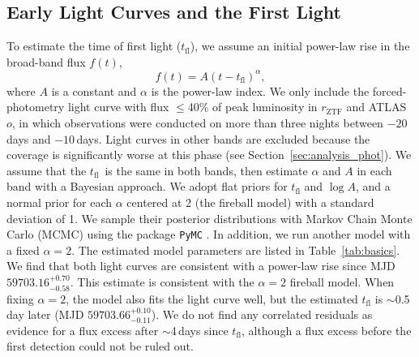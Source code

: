 \documentclass[twocolumn]{aastex631}
\newcommand{\tfl}{$t_\mathrm{fl}$}
\begin{document}
\begin{CJK*}{UTF8}{gbsn}
\subsection{Early Light Curves and the First Light}
To estimate the time of first light ($t_\mathrm{fl}$), we assume an initial power-law rise in the broad-band flux $f(t)$,
$$
f(t) = A (t-t_\mathrm{fl})^\alpha,
$$
where $A$ is a constant and $\alpha$ is the power-law index. We only include the forced-photometry light curve with flux $\le$40\% of peak luminosity \citep{Miller_ZTF_2020} in $r_\mathrm{ZTF}$ and ATLAS $o$, in which observations were conducted on more than three nights between $-20$\,days and $-10$\,days. Light curves in other bands are excluded because the coverage is significantly worse at this phase (see Section~\ref{sec:analysis_phot}). We assume that the \tfl\ is the same in both bands, then estimate $\alpha$ and $A$ in each band with a Bayesian approach. We adopt flat priors for $t_\mathrm{fl}$ and $\log A$, and a normal prior for each $\alpha$ centered at 2 (the fireball model) with a standard deviation of 1. We sample their posterior distributions with Markov Chain Monte Carlo (MCMC) using the package \texttt{PyMC} \citep{pymc_2016}. In addition, we run another model with a fixed $\alpha=2$. The estimated model parameters are listed in Table~\ref{tab:basics}. We find that both light curves are consistent with a power-law rise since MJD $59703.16^{+0.70}_{-0.58}$. %
This estimate is consistent with the $\alpha=2$ fireball model. When fixing $\alpha=2$, the model also fits the light curve well, but the estimated $t_\mathrm{fl}$ is $\sim$0.5\,day later (MJD $59703.66_{-0.11}^{+0.10}$). We do not find any correlated residuals as evidence for a flux excess after $\sim$4\,days since $t_\mathrm{fl}$, although a flux excess before the first detection could not be ruled out.



\end{CJK*}
\end{document}
